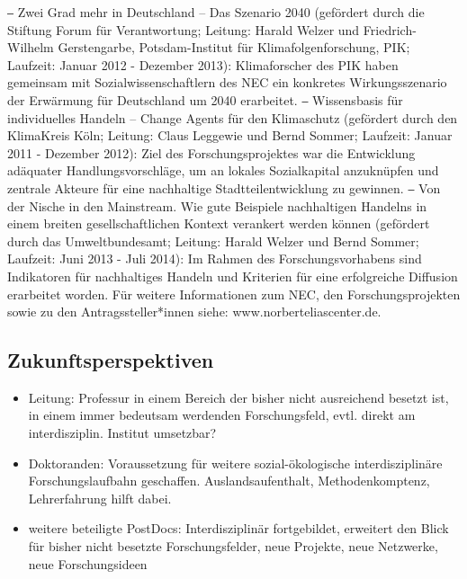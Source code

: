 ⎯	Zwei Grad mehr in Deutschland – Das Szenario 2040 (gefördert durch die Stiftung Forum für Verantwortung; Leitung: Harald Welzer und Friedrich-Wilhelm Gerstengarbe, Potsdam-Institut für Klimafolgenforschung, PIK; Laufzeit: Januar 2012 - Dezember 2013): Klimaforscher des PIK haben gemeinsam mit Sozialwissenschaftlern des NEC ein konkretes Wirkungsszenario der Erwärmung für Deutschland um 2040 erarbeitet.
⎯	Wissensbasis für individuelles Handeln – Change Agents für den Klimaschutz (gefördert durch den KlimaKreis Köln; Leitung: Claus Leggewie und Bernd Sommer; Laufzeit: Januar 2011 - Dezember 2012): Ziel des Forschungsprojektes war die Entwicklung adäquater Handlungsvorschläge, um an lokales Sozialkapital anzuknüpfen und zentrale Akteure für eine nachhaltige Stadtteilentwicklung zu gewinnen. 
⎯	Von der Nische in den Mainstream. Wie gute Beispiele nachhaltigen Handelns in einem breiten gesellschaftlichen Kontext verankert werden können (gefördert durch das Umweltbundesamt; Leitung: Harald Welzer und Bernd Sommer; Laufzeit: Juni 2013 - Juli 2014): Im Rahmen des Forschungsvorhabens sind Indikatoren für nachhaltiges Handeln und Kriterien für eine erfolgreiche Diffusion erarbeitet worden. 
Für weitere Informationen zum NEC, den Forschungsprojekten sowie zu den Antragssteller*innen siehe: www.norberteliascenter.de.


\subsection*{Zukunftsperspektiven}
\begin{itemize}
 \item Leitung: Professur in einem Bereich der bisher nicht ausreichend besetzt ist, in einem immer bedeutsam werdenden Forschungsfeld, evtl. direkt am interdisziplin. Institut umsetzbar?
 \item Doktoranden: Voraussetzung für weitere sozial-ökologische interdisziplinäre Forschungslaufbahn geschaffen. Auslandsaufenthalt, Methodenkomptenz, Lehrerfahrung hilft dabei.
 \item weitere beteiligte PostDocs: Interdisziplinär fortgebildet, erweitert den Blick für bisher nicht besetzte Forschungsfelder, neue Projekte, neue Netzwerke, neue Forschungsideen
\end{itemize}

